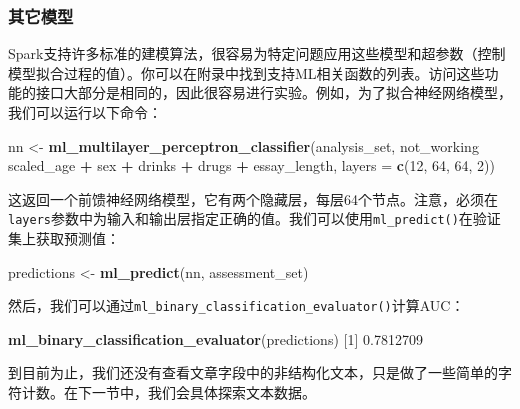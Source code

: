 \documentclass[
]{article}
\newenvironment{Shaded}{\begin{snugshade}}{\end{snugshade}}
\newcommand{\DataTypeTok}[1]{\textcolor[rgb]{0.13,0.29,0.53}{#1}}
\newcommand{\DecValTok}[1]{\textcolor[rgb]{0.00,0.00,0.81}{#1}}
\newcommand{\FloatTok}[1]{\textcolor[rgb]{0.00,0.00,0.81}{#1}}
\newcommand{\KeywordTok}[1]{\textcolor[rgb]{0.13,0.29,0.53}{\textbf{#1}}}
\newcommand{\NormalTok}[1]{#1}
\newcommand{\OperatorTok}[1]{\textcolor[rgb]{0.81,0.36,0.00}{\textbf{#1}}}
\newcommand{\StringTok}[1]{\textcolor[rgb]{0.31,0.60,0.02}{#1}}
\begin{document}
\hypertarget{ux5176ux5b83ux6a21ux578b}{%
\subsubsection{其它模型}\label{ux5176ux5b83ux6a21ux578b}}

Spark支持许多标准的建模算法，很容易为特定问题应用这些模型和超参数（控制模型拟合过程的值）。你可以在附录中找到支持ML相关函数的列表。访问这些功能的接口大部分是相同的，因此很容易进行实验。例如，为了拟合神经网络模型，我们可以运行以下命令：

\begin{Shaded}
\begin{Highlighting}[]
\NormalTok{nn <-}\StringTok{ }\KeywordTok{ml_multilayer_perceptron_classifier}\NormalTok{(analysis_set, not_working }\OperatorTok{~}\StringTok{ }\NormalTok{scaled_age }\OperatorTok{+}\StringTok{ }
\StringTok{    }\NormalTok{sex }\OperatorTok{+}\StringTok{ }\NormalTok{drinks }\OperatorTok{+}\StringTok{ }\NormalTok{drugs }\OperatorTok{+}\StringTok{ }\NormalTok{essay_length, }\DataTypeTok{layers =} \KeywordTok{c}\NormalTok{(}\DecValTok{12}\NormalTok{, }\DecValTok{64}\NormalTok{, }\DecValTok{64}\NormalTok{, }\DecValTok{2}\NormalTok{))}
\end{Highlighting}
\end{Shaded}

这返回一个前馈神经网络模型，它有两个隐藏层，每层64个节点。注意，必须在\texttt{layers}参数中为输入和输出层指定正确的值。我们可以使用\texttt{ml\_predict()}在验证集上获取预测值：

\begin{Shaded}
\begin{Highlighting}[]
\NormalTok{predictions <-}\StringTok{ }\KeywordTok{ml_predict}\NormalTok{(nn, assessment_set)}
\end{Highlighting}
\end{Shaded}

然后，我们可以通过\texttt{ml\_binary\_classification\_evaluator()}计算AUC：

\begin{Shaded}
\begin{Highlighting}[]
\KeywordTok{ml_binary_classification_evaluator}\NormalTok{(predictions)}
\NormalTok{[}\DecValTok{1}\NormalTok{] }\FloatTok{0.7812709}
\end{Highlighting}
\end{Shaded}

到目前为止，我们还没有查看文章字段中的非结构化文本，只是做了一些简单的字符计数。在下一节中，我们会具体探索文本数据。
\end{document}
